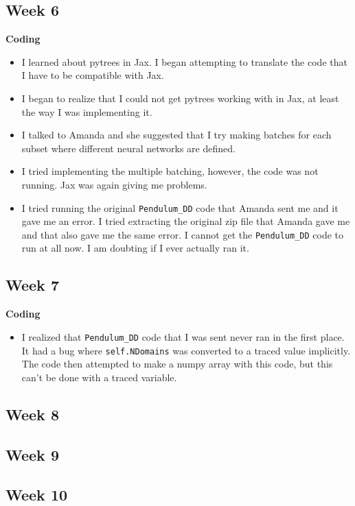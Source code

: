 \documentclass{article}
\begin{document}
\subsection*{Week 6}
\textbf{Coding}
\begin{itemize}
\item I learned about pytrees in Jax. I began attempting to translate the code that I have to be compatible with Jax.
\item I began to realize that I could not get pytrees working with in Jax, at least the way I was implementing it.
\item I talked to Amanda and she suggested that I try making batches for each subset where different neural networks are defined.
\item I tried implementing the multiple batching, however, the code was not running. Jax was again giving me problems.
\item I tried running the original \verb|Pendulum_DD| code that Amanda sent me and it gave me an error. I tried extracting the original zip file that Amanda gave me and that also gave me the same error. I cannot get the \verb|Pendulum_DD| code to run at all now. I am doubting if I ever actually ran it.
\end{itemize}
\subsection*{Week 7}
\textbf{Coding}
\begin{itemize}
\item I realized that \verb|Pendulum_DD| code that I was sent never ran  in the first place. It had a bug where \verb|self.NDomains| was converted to a traced value implicitly. The code then attempted to make a numpy array with this code, but this can't be done with a traced variable.
\end{itemize}
\newpage 
\subsection*{Week 8} 
\newpage
\subsection*{Week 9}
\newpage
\subsection*{Week 10}  
\newpage
\end{document}
